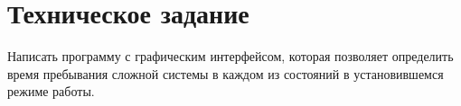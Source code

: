 \chapter{Техническое задание}

Написать программу с графическим интерфейсом, которая позволяет определить время пребывания сложной системы в каждом из состояний в установившемся режиме работы.
